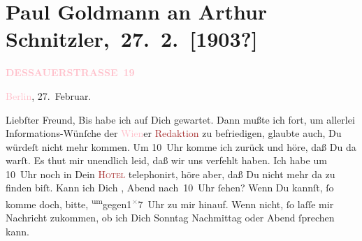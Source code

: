 

\renewcommand{\erwaehnteInstitutionen}{Institutionen: Neue Freie Presse, Palasthotel Berlin}
\renewcommand{\erwaehnteOrte}{Orte: Berlin, Dessauer Straße, Wien}
\renewcommand{\erwaehnteWerke}{Werke: Der Schleier der Beatrice. Schauspiel in fünf Akten}
\section[ Paul Goldmann an Arthur Schnitzler, 27. 2. {[}1903?{]}]{Paul Goldmann an Arthur Schnitzler, 27. 2. {[}1903?{]}}
\nopagebreak{}
\rehead{ }\normalsize\beginnumbering{}
\toendnotes[C]{\smallbreak\pagebreak[2]}
\toendnotes[C]{\smallbreak}
\pstart
           \noindent{}\raggedleft{}{\pb}\textcolor{gray}{\textbf{\textcolor{pink}{DESSAUERSTRASSE 19}{}\ledrightnote{\textcolor{pink}{Dessauer Straße}}}}\pend
           
\pstart
           \textcolor{pink}{Berlin}{}\ledrightnote{\textcolor{pink}{Berlin}}, 27. Februar.\pend
           
\pstart\center{}Liebſter Freund,\pend
\pstart
           Bis \label{K_L03365-11v}\label{K_L03365-11h} habe ich auf Dich gewartet. Dann mußte ich fort, um allerlei
                  Informations-Wünſche der \textcolor{pink}{Wien}{}\ledrightnote{\textcolor{pink}{Wien}}er \textcolor{brown}{Redaktion}{}\ledrightnote{{$\rightarrow$}\textcolor{brown}{Neue Freie Presse}} zu
               befriedigen, glaubte auch, Du würdeſt nicht mehr kommen. Um 10 Uhr komme
               ich zurück und höre, daß Du da {\pb}warſt. Es thut mir
               unendlich leid, daß wir uns verfehlt haben. Ich habe um 10 Uhr noch in
               Dein \textsc{\textcolor{brown}{Hotel}{}\ledrightnote{\textcolor{brown}{Palasthotel Berlin}}} telephonirt, höre aber, daß Du nicht mehr da zu finden biſt. Kann ich Dich
                  \label{K_L03365-1v}\label{K_L03365-1h}, Abend
                  nach 10 Uhr ſehen? Wenn Du kannſt, ſo komme doch, bitte, \substVorne{}\textsuperscript{um}\substDazwischen{}gegen\substHinten{}{ }1\substVorne{}\textsuperscript{\textcolor{gray}{×}}\substDazwischen{}7\substHinten{} Uhr zu mir hinauf. Wenn {\pb}nicht, ſo
               laſſe mir Nachricht zukommen, ob ich Dich Sonntag{ }Nachmittag oder Abend ſprechen kann.\pend
           
